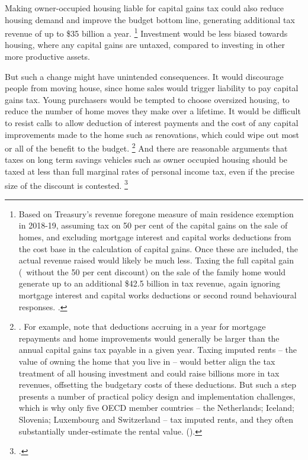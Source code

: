 Making owner-occupied housing liable for capital gains tax could also reduce housing demand and improve the budget bottom line, generating additional tax revenue of up to \$35 billion a year.%
	\footnote{Based on Treasury's revenue foregone measure of main residence exemption in 2018-19, assuming tax on 50 per cent of the capital gains on the sale of homes, and excluding mortgage interest and capital works deductions from the cost base in the calculation of capital gains. Once these are included, the actual revenue raised would likely be much less. Taxing the full capital gain (\ie~without the 50 per cent discount) on the sale of the family home would generate up to an additional \$42.5 billion in tax revenue, again ignoring mortgage interest and capital works deductions or second round behavioural responses.   
	\textcite[][102--103]{Treasury-2018-TES-for-2017}.} %
Investment would be less biased towards housing, where any capital gains are untaxed, compared to investing in other more productive assets. 

But such a change might have unintended consequences.
It would discourage people from moving house, since home sales would trigger liability to pay capital gains tax.
Young purchasers would be tempted to choose oversized housing, to reduce the number of home moves they make over a lifetime.
It would be difficult to resist calls to allow deduction of interest payments and the cost of any capital improvements made to the home such as renovations, which could wipe out most or all of the benefit to the budget.%
	\footnote{\textcite[][40--41]{DaleyEtAl-2013-BalancingBudgets}.
	For example, \textcite[][18]{DaleyEtAl-2013-BalancingBudgets-supporting-analysis} note that deductions accruing in a year for mortgage repayments and home improvements would generally be larger than the annual capital gains tax payable in a given year.
	Taxing imputed rents -- the value of owning the home that you live in -- would better align the tax treatment of all housing investment and could raise billions more in tax revenues, offsetting the budgetary costs of these deductions.
	But such a step presents a number of practical policy design and implementation challenges, which is why only five OECD member countries -- the Netherlands; Iceland; Slovenia; Luxembourg and Switzerland -- tax imputed rents, and they often substantially under-estimate the rental value. (\textcites{AndrewsEtAlHousing}[][134]{PC-2015-Housing-decisions-elderly}).}
And there are reasonable arguments that taxes on long term savings vehicles such as owner occupied housing should be taxed at less than full marginal rates of personal income tax, even if the precise size of the discount is contested.%
    \footcites[][22]{DaleyCoatesWood-2015-Super-tax-targeting}[][9]{DaleyWood2016-Negative-Gearing-CGT}

